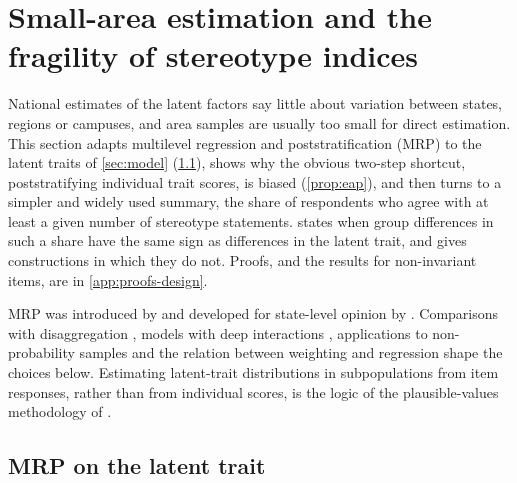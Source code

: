 \section{Small-area estimation and the fragility of stereotype indices}\label{sec:smallarea}

\providecommand{\ECV}{\mathrm{ECV}}
\providecommand{\SDB}{\mathrm{SDB}}

National estimates of the latent factors say little about variation between states, regions or campuses, and area samples are usually too small for direct estimation. This section adapts multilevel regression and poststratification (MRP) to the latent traits of \cref{sec:model} (\cref{sec:sa-mrp}), shows why the obvious two-step shortcut, poststratifying individual trait scores, is biased (\cref{prop:eap}), and then turns to a simpler and widely used summary, the share of respondents who agree with at least a given number of stereotype statements.  states when group differences in such a share have the same sign as differences in the latent trait, and gives constructions in which they do not. Proofs, and the results for non-invariant items, are in \cref{app:proofs-design}.

MRP was introduced by \citet{gelman1997} and developed for state-level opinion by \citet{park2004}. Comparisons with disaggregation \citep{lax2009}, models with deep interactions \citep{ghitza2013}, applications to non-probability samples \citep{wang2015} and the relation between weighting and regression \citep{gelman2007} shape the choices below. Estimating latent-trait distributions in subpopulations from item responses, rather than from individual scores, is the logic of the plausible-values methodology of \citet{mislevy1991}.

\subsection{MRP on the latent trait}\label{sec:sa-mrp}

